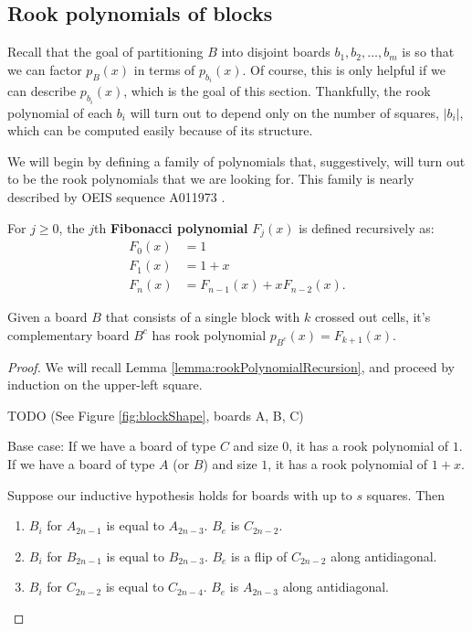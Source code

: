 


\subsection{Rook polynomials of blocks}
Recall that the goal of partitioning $B$ into disjoint boards $b_1, b_2, \dots, b_m$
is so that we can factor $p_B(x)$ in terms of $p_{b_i}(x)$. Of course, this is
only helpful if we can describe $p_{b_i}(x)$, which is the goal of this section.
Thankfully, the rook polynomial of each $b_i$ will turn out to depend only on the
number of squares, $|b_i|$, which can be computed easily because of its structure.

We will begin by defining a family of polynomials that, suggestively, will turn
out to be the rook polynomials that we are looking for. This family is nearly
described by OEIS sequence A011973 \cite{oeis}.
\begin{definition}
  For $j \geq 0$, the $j$th \textbf{Fibonacci polynomial} $F_{j}(x)$ is defined recursively as:
  \begin{align}
    F_0(x) &= 1 \\
    F_1(x) &= 1 + x \\
    F_n(x) &= F_{n-1}(x) + xF_{n-2}(x).
  \end{align}
\end{definition}

\begin{lemma}
  Given a board $B$ that consists of a single block with $k$ crossed out cells,
  it's complementary board $B^c$ has rook polynomial $p_{B^c}(x) = F_{k + 1}(x)$.
\end{lemma}
\begin{proof}
  We will recall Lemma \ref{lemma:rookPolynomialRecursion}, and proceed by
  induction on the upper-left square.

  TODO (See Figure \ref{fig:blockShape}, boards A, B, C)

  Base case:
  If we have a board of type $C$ and size $0$, it has a rook polynomial of $1$.
  If we have a board of type $A$ (or $B$) and size $1$, it has a rook polynomial of $1 + x$.

  Suppose our inductive hypothesis holds for boards with up to $s$ squares. Then
  \begin{enumerate}
    \item $B_i$ for $A_{2n-1}$ is equal to $A_{2n-3}$. $B_e$ is $C_{2n-2}$.
    \item $B_i$ for $B_{2n-1}$ is equal to $B_{2n-3}$. $B_e$ is a flip of $C_{2n-2}$ along antidiagonal.
    \item $B_i$ for $C_{2n-2}$ is equal to $C_{2n-4}$. $B_e$ is $A_{2n-3}$ along antidiagonal.
  \end{enumerate}
\end{proof}

